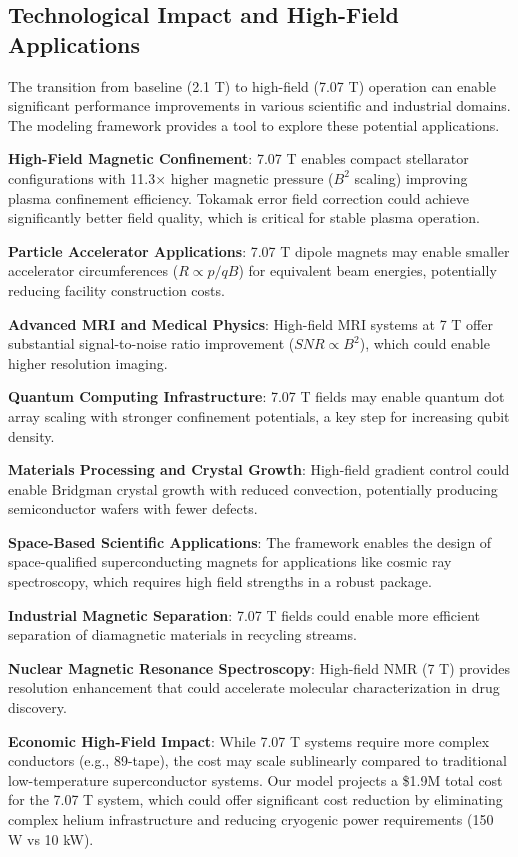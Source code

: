 \documentclass[10pt,twocolumn]{article}
\begin{document}
\subsection{Technological Impact and High-Field Applications}

The transition from baseline (2.1 T) to high-field (7.07 T) operation can enable significant performance improvements in various scientific and industrial domains. The modeling framework provides a tool to explore these potential applications.

\textbf{High-Field Magnetic Confinement}: 7.07 T enables compact stellarator configurations with 11.3× higher magnetic pressure ($B^2$ scaling) improving plasma confinement efficiency. Tokamak error field correction could achieve significantly better field quality, which is critical for stable plasma operation.

\textbf{Particle Accelerator Applications}: 7.07 T dipole magnets may enable smaller accelerator circumferences ($R \propto p/qB$) for equivalent beam energies, potentially reducing facility construction costs.

\textbf{Advanced MRI and Medical Physics}: High-field MRI systems at 7 T offer substantial signal-to-noise ratio improvement ($SNR \propto B^2$), which could enable higher resolution imaging.

\textbf{Quantum Computing Infrastructure}: 7.07 T fields may enable quantum dot array scaling with stronger confinement potentials, a key step for increasing qubit density.

\textbf{Materials Processing and Crystal Growth}: High-field gradient control could enable Bridgman crystal growth with reduced convection, potentially producing semiconductor wafers with fewer defects.

\textbf{Space-Based Scientific Applications}: The framework enables the design of space-qualified superconducting magnets for applications like cosmic ray spectroscopy, which requires high field strengths in a robust package.

\textbf{Industrial Magnetic Separation}: 7.07 T fields could enable more efficient separation of diamagnetic materials in recycling streams.

\textbf{Nuclear Magnetic Resonance Spectroscopy}: High-field NMR (7 T) provides resolution enhancement that could accelerate molecular characterization in drug discovery.

\textbf{Economic High-Field Impact}: While 7.07 T systems require more complex conductors (e.g., 89-tape), the cost may scale sublinearly compared to traditional low-temperature superconductor systems. Our model projects a \$1.9M total cost for the 7.07 T system, which could offer significant cost reduction by eliminating complex helium infrastructure and reducing cryogenic power requirements (150 W vs 10 kW).
\end{document}
